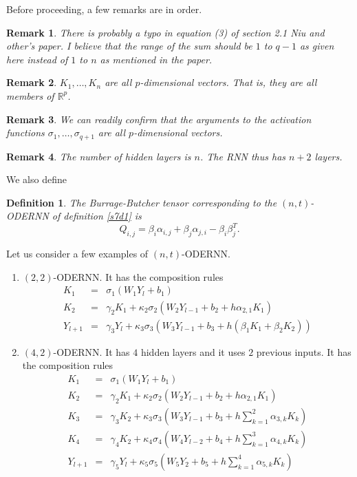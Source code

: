 \documentclass{article}
\numberwithin{equation}{section}
\newtheorem{defn}{Definition}
\newtheorem*{rem}{Remark}
\begin{document}
\noindent Before proceeding, a few remarks are in order.
\begin{rem}
There is probably a typo in equation (3) of section 2.1 Niu and other's
paper\cite{niu2019recurrent}. I believe that the range of the sum should
be $1$ to $q - 1$ as given here instead of $1$ to $n$ as mentioned in the
paper.
\end{rem}
\begin{rem}
$K_1, \ldots, K_n$ are all $p$-dimensional vectors. That is, they 
are all members of $\mathbb{R}^p$.
\end{rem}
\begin{rem}
We can readily confirm that the arguments to the activation functions
$\sigma_1, \ldots, \sigma_{q+1}$ are all $p$-dimensional vectors.
\end{rem}
\begin{rem}
The number of hidden layers is $n$. The RNN thus has $n + 2$ layers. 
\end{rem}

\noindent We also define
\begin{defn}\label{s7d2}
The Burrage-Butcher tensor corresponding to the $(n,t)$-ODERNN of 
definition \ref{s7d1} is
\begin{equation}\label{s7e4}
Q_{i, j} = \beta_i\alpha_{i, j} + \beta_j\alpha_{j, i} - \beta_i\beta_j^T.
\end{equation}
\end{defn}

\noindent Let us consider a few examples of $(n,t)$-ODERNN.
\begin{enumerate}
\item $(2,2)$-ODERNN. It has the composition rules
\begin{eqnarray*}
K_1 &=& \sigma_1(W_1 Y_l + b_1) \\
K_2 &=& \gamma_2K_1 + \kappa_2\sigma_2(W_2Y_{l-1}+b_2+h\alpha_{2,1}K_1) \\
Y_{l+1} &=& \gamma_3Y_l + \kappa_3\sigma_3\left(
 W_3 Y_{l-1} + b_3 + h(\beta_1K_1 + \beta_2K_2)\right)
\end{eqnarray*}
\item $(4, 2)$-ODERNN. It has $4$ hidden layers and it uses $2$ previous
inputs. It has the composition rules
\begin{eqnarray*}
K_1 &=& \sigma_1(W_1 Y_l + b_1) \\
K_2 &=& \gamma_2K_1 + \kappa_2\sigma_2(W_2Y_{l-1}+b_2+h\alpha_{2,1}K_1) \\
K_3 &=& \gamma_3K_2 + \kappa_3\sigma_3\left(W_3Y_{l-1} + b_3 + 
    h\sum_{k=1}^{2}\alpha_{3, k}K_k\right) \\
K_4 &=& \gamma_4K_2 + \kappa_4\sigma_4\left(W_4Y_{l-2} + b_4 + 
    h\sum_{k=1}^{3}\alpha_{4, k}K_k\right) \\
Y_{l+1} &=& \gamma_5Y_l + \kappa_5\sigma_5\left(W_5Y_2 + b_5 + 
    h\sum_{k=1}^{4}\alpha_{5, k}K_k\right) 
\end{eqnarray*}
\end{enumerate}
\end{document}
